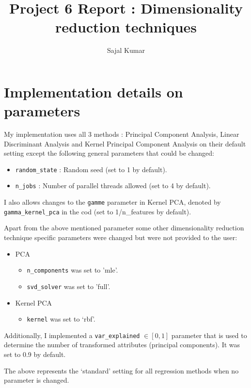 \documentclass[12pt]{article}
\title{\textbf{Project 6 Report : Dimensionality reduction techniques}}
\author{Sajal Kumar}
\date{}
\begin{document}
\maketitle

\section*{Implementation details on parameters}

My implementation uses all 3 methods : Principal Component Analysis, Linear Discriminant Analysis and  Kernel Principal Component Analysis on their default setting except the following general parameters that could be changed:

\begin{itemize}
\item \texttt{random\_state} : Random seed (set to 1 by default).
\item \texttt{n\_jobs} : Number of parallel threads allowed (set to 4 by default).
\end{itemize}

I also allows changes to the \texttt{gamme} parameter in Kernel PCA, denoted by \texttt{gamma\_kernel\_pca} in the cod (set to 1/n\_features by default).

Apart from the above mentioned parameter some other dimensionality reduction technique specific parameters were changed but were not provided to the user:

\begin{itemize}
\item PCA
\begin{itemize}
\item \texttt{n\_components} was set to 'mle'.
\item \texttt{svd\_solver} was set to 'full'.
\end{itemize}
\item Kernel PCA
\begin{itemize}
\item \texttt{kernel} was set to `rbf'.
\end{itemize}
\end{itemize}

Additionally, I implemented a \texttt{var\_explained} $\in [0,1]$ parameter that is used to determine the number of transformed attributes (principal components). It was set to 0.9 by default.

The above represents the `standard' setting for all regression methods when no parameter is changed. 
\end{document}
